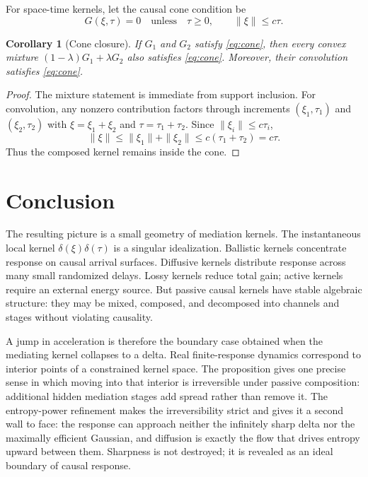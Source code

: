 \documentclass[10pt]{article}
\newtheorem{corollary}{Corollary}
\begin{document}
For space-time kernels, let the causal cone condition be
\begin{equation}\label{eq:cone}
G(\xi,\tau)=0
\quad\text{unless}\quad
\tau\ge0,
\qquad \|\xi\|\le c\tau.
\end{equation}

\begin{corollary}[Cone closure]
If $G_1$ and $G_2$ satisfy \eqref{eq:cone}, then every convex mixture
$(1-\lambda)G_1+\lambda G_2$ also satisfies \eqref{eq:cone}. Moreover,
their convolution satisfies \eqref{eq:cone}.
\end{corollary}

\begin{proof}
The mixture statement is immediate from support inclusion. For convolution, any nonzero contribution factors through increments $(\xi_1,\tau_1)$ and $(\xi_2,\tau_2)$ with $\xi=\xi_1+\xi_2$ and $\tau=\tau_1+\tau_2$. Since $\|\xi_i\|\le c\tau_i$,
\[
\|\xi\|\le \|\xi_1\|+\|\xi_2\|
\le c(\tau_1+\tau_2)=c\tau.
\]
Thus the composed kernel remains inside the cone.
\end{proof}

\section{Conclusion}

The resulting picture is a small geometry of mediation kernels. The instantaneous local kernel $\delta(\xi)\delta(\tau)$ is a singular idealization. Ballistic kernels concentrate response on causal arrival surfaces. Diffusive kernels distribute response across many small randomized delays. Lossy kernels reduce total gain; active kernels require an external energy source. But passive causal kernels have stable algebraic structure: they may be mixed, composed, and decomposed into channels and stages without violating causality.

A jump in acceleration is therefore the boundary case obtained when the mediating kernel collapses to a delta. Real finite-response dynamics correspond to interior points of a constrained kernel space. The proposition gives one precise sense in which moving into that interior is irreversible under passive composition: additional hidden mediation stages add spread rather than remove it. The entropy-power refinement makes the irreversibility strict and gives it a second wall to face: the response can approach neither the infinitely sharp delta nor the maximally efficient Gaussian, and diffusion is exactly the flow that drives entropy upward between them. Sharpness is not destroyed; it is revealed as an ideal boundary of causal response.
\end{document}
